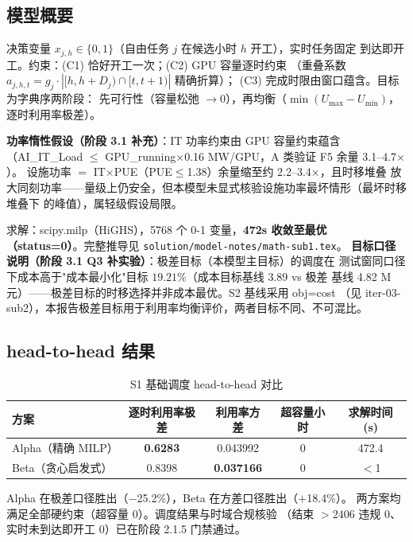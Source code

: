 \documentclass{internal-report}
\begin{document}
\subsection{模型概要}

决策变量 $x_{j,h}\in\{0,1\}$（自由任务 $j$ 在候选小时 $h$ 开工），实时任务固定
到达即开工。约束：(C1) 恰好开工一次；(C2) GPU 容量逐时约束
（重叠系数 $a_{j,h,t}=g_j\cdot|[h,h+D_j)\cap[t,t+1)|$ 精确折算）；
(C3) 完成时限由窗口蕴含。目标为字典序两阶段：
先可行性（容量松弛 $\to0$），再均衡（$\min(U_{\max}-U_{\min})$，逐时利用率极差）。

\textbf{功率惰性假设（阶段 3.1 补充）}：IT 功率约束由 GPU 容量约束蕴含
（AI\_IT\_Load $\le$ GPU\_running$\times$0.16 MW/GPU，A 类验证 F5 余量 3.1--4.7$\times$）。
设施功率 $=$ IT$\times$PUE（PUE$\le$1.38）余量缩至约 2.2--3.4$\times$，且时移堆叠
放大同刻功率——量级上仍安全，但本模型未显式核验设施功率最坏情形（最坏时移堆叠下
的峰值），属轻级假设局限。

求解：scipy.milp（HiGHS），5768 个 0-1 变量，\textbf{472s 收敛至最优
（status=0）}。完整推导见 \texttt{solution/model-notes/math-sub1.tex}。
\textbf{目标口径说明（阶段 3.1 Q3 补实验）}：极差目标（本模型主目标）的调度在
测试窗同口径下成本高于"成本最小化"目标 $19.21\%$（成本目标基线 3.89 vs 极差
基线 4.82 M 元）——极差目标的时移选择并非成本最优。S2 基线采用 obj=cost
（见 iter-03-sub2），本报告极差目标用于利用率均衡评价，两者目标不同、不可混比。

\subsection{head-to-head 结果}

\begin{table}[h]
\centering
\footnotesize
\begin{tabular}{lcccc}
\toprule
方案 & 逐时利用率极差 & 利用率方差 & 超容量小时 & 求解时间 (s) \\
\midrule
Alpha（精确 MILP） & \textbf{0.6283} & 0.043992 & 0 & 472.4 \\
Beta（贪心启发式） & 0.8398 & \textbf{0.037166} & 0 & $<$1 \\
\bottomrule
\end{tabular}
\caption{S1 基础调度 head-to-head 对比}
\label{tab:head2head}
\end{table}

Alpha 在极差口径胜出（$-$25.2\%），Beta 在方差口径胜出（$+$18.4\%）。
两方案均满足全部硬约束（超容量 0）。调度结果与时域合规核验
（结束 $>2406$ 违规 0、实时未到达即开工 0）已在阶段 2.1.5 门禁通过。
\end{document}

